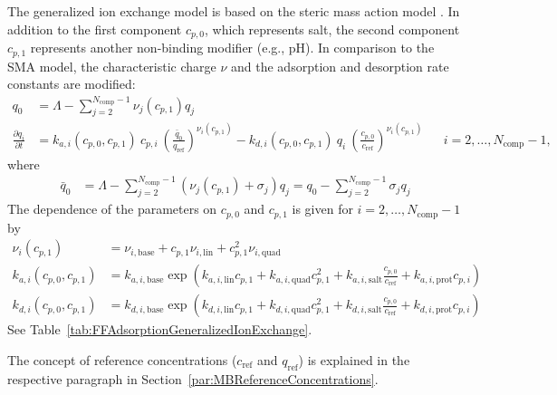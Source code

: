 The generalized ion exchange model is based on the steric mass action model \cite{Huuk2017,Mollerup2008}. 
In addition to the first component $c_{p,0}$, which represents salt, the second component $c_{p,1}$ represents another non-binding modifier (e.g., pH).
In comparison to the SMA model, the characteristic charge $\nu$ and the adsorption and desorption rate constants are modified:
\begin{align*}
  q_0 &= \Lambda - \sum_{j=2}^{N_{\text{comp}} - 1} \nu_j(c_{p,1}) q_j \\
  \frac{\partial q_i}{\partial t} &= k_{a,i}(c_{p,0},c_{p,1}) \: c_{p,i} \: \left( \frac{\bar{q}_0 }{q_{\text{ref}}} \right)^{\nu_i(c_{p,1})} - k_{d,i}(c_{p,0},c_{p,1}) \: q_i \: \left( \frac{c_{p,0}}{c_{\text{ref}}} \right)^{\nu_i(c_{p,1})} & &i = 2, \dots, N_{\text{comp}} - 1,
\end{align*}
where
\begin{align*}
  \bar{q}_0 &= \Lambda - \sum_{j=2}^{N_{\text{comp}} - 1} \left( \nu_j(c_{p,1}) + \sigma_j \right) q_j = q_0 - \sum_{j=2}^{N_{\text{comp}} - 1} \sigma_j q_j
\end{align*}
The dependence of the parameters on $c_{p,0}$ and $c_{p,1}$ is given for $i = 2, \dots, N_{\text{comp}} - 1$ by
\begin{align*}
  \nu_i(c_{p,1}) &= \nu_{i,\mathrm{base}} + c_{p,1} \nu_{i,\mathrm{lin}} + c_{p,1}^2 \nu_{i,\mathrm{quad}} \\
  k_{a,i}\left(c_{p,0}, c_{p,1}\right) &= k_{a,i,\mathrm{base}} \exp\left(k_{a,i,\mathrm{lin}} c_{p,1} + k_{a,i,\mathrm{quad}} c_{p,1}^2 + k_{a,i,\mathrm{salt}} \frac{c_{p,0}}{c_{\text{ref}}} + k_{a,i,\mathrm{prot}} c_{p,i}\right) \\
  k_{d,i}\left(c_{p,0}, c_{p,1}\right) &= k_{d,i,\mathrm{base}} \exp\left(k_{d,i,\mathrm{lin}} c_{p,1} + k_{d,i,\mathrm{quad}} c_{p,1}^2 + k_{d,i,\mathrm{salt}} \frac{c_{p,0}}{c_{\text{ref}}} + k_{d,i,\mathrm{prot}} c_{p,i}\right)
\end{align*}
See Table~\ref{tab:FFAdsorptionGeneralizedIonExchange}.

The concept of reference concentrations ($c_{\text{ref}}$ and $q_{\text{ref}}$) is explained in the respective paragraph in Section~\ref{par:MBReferenceConcentrations}.
